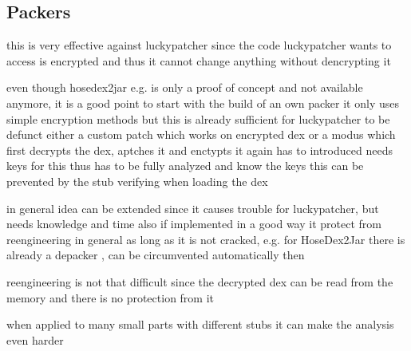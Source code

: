 \subsection{Packers}
\label{subsection:evaluation-reengineering-packers}
this is very effective against luckypatcher since the code luckypatcher wants to access is encrypted and thus it cannot change anything without dencrypting it

even though hosedex2jar e.g. is only a proof of concept and not available anymore, it is a good point to start with the build of an own packer
it only uses simple encryption methods but this is already sufficient for luckypatcher to be defunct
either a custom patch which works on encrypted dex or a modus which first decrypts the dex, aptches it and enctypts it again  has to introduced
needs keys for this thus has to be fully analyzed and know the keys
this can be prevented by the stub verifying when loading the dex

in general idea can be extended since it causes trouble for luckypatcher, but needs knowledge and time
also if implemented in a good way it protect from reengineering in general as long as it is not cracked, e.g. for HoseDex2Jar there is already a depacker \cite{githubDehoser}, can be circumvented automatically then

reengineering is not that difficult since the decrypted dex can be read from the memory and there is no protection from it

when applied to many small parts with different stubs it can make the analysis even harder
